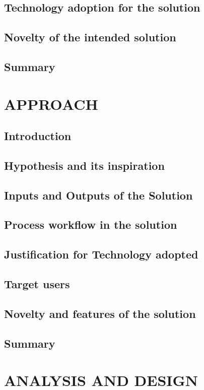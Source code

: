 \documentclass[12pt, a4paper]{report}
\begin{document}
\section{Technology adoption for the solution}
\section{Novelty of the intended solution}
\section{Summary}

\chapter{APPROACH}
\section{Introduction}
\section{Hypothesis and its inspiration}
\section{Inputs and Outputs of the Solution}
\section{Process workflow in the solution}
\section{Justification for Technology adopted}
\section{Target users}
\section{Novelty and features of the solution}
\section{Summary}

\chapter{ANALYSIS AND DESIGN}
\end{document}
